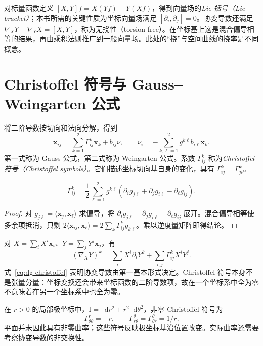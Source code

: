 \documentclass[UTF8,12pt,a4paper,fontset=fandol]{ctexbook}
\newcommand{\dd}{\mathop{}\!\mathrm d}
\newcommand{\ip}[2]{\langle #1,#2\rangle}
\begin{document}
对标量函数定义 $[X,Y]f=X(Yf)-Y(Xf)$，得到向量场的\emph{Lie 括号（Lie bracket）}；本书所需的关键性质为坐标向量场满足 $[\partial_i,\partial_j]=0$。协变导数还满足 $\nabla_XY-\nabla_YX=[X,Y]$，称为无挠性（torsion-free）。在坐标基上这是混合偏导相等的结果，再由乘积法则推广到一般向量场。此处的“挠”与空间曲线的挠率是不同概念。

\section{Christoffel 符号与 Gauss--Weingarten 公式}
将二阶导数按切向和法向分解，得到
\begin{equation}
 \mathbf x_{ij}=\sum_{k=1}^2\Gamma^k_{ij}\mathbf x_k+b_{ij}\nu,
 \qquad
 \nu_i=-\sum_{k,\ell=1}^2g^{k\ell}b_{i\ell}\mathbf x_k.
 \label{eq:dg-gauss-weingarten}
\end{equation}
第一式称为 Gauss 公式，第二式称为 Weingarten 公式。系数 $\Gamma^k_{ij}$ 称为\emph{Christoffel 符号（Christoffel symbols）}。它们描述坐标切向基自身的变化，具有 $\Gamma^k_{ij}=\Gamma^k_{ji}$。

\begin{proposition}
\begin{equation}
 \Gamma^k_{ij}=\frac12\sum_{\ell=1}^2g^{k\ell}
 (\partial_i g_{j\ell}+\partial_jg_{i\ell}-\partial_\ell g_{ij}).
 \label{eq:dg-christoffel}
\end{equation}
\end{proposition}
\begin{proof}
对 $g_{j\ell}=\ip{\mathbf x_j}{\mathbf x_\ell}$ 求偏导，将 $\partial_i g_{j\ell}+\partial_jg_{i\ell}-\partial_\ell g_{ij}$ 展开。混合偏导相等使多余项抵消，只剩 $2\ip{\mathbf x_{ij}}{\mathbf x_\ell}=2\sum_k\Gamma^k_{ij}g_{k\ell}$。乘以逆度量矩阵即得结论。
\end{proof}
对 $X=\sum_iX^i\mathbf x_i$、$Y=\sum_jY^j\mathbf x_j$，有
\begin{equation}
 (\nabla_XY)^k=\sum_iX^i\partial_iY^k+
 \sum_{i,j}\Gamma^k_{ij}X^iY^j.
 \label{eq:dg-covariant-coordinates}
\end{equation}
式~\eqref{eq:dg-christoffel} 表明协变导数由第一基本形式决定。Christoffel 符号本身不是张量分量：坐标变换还会带来坐标函数的二阶导数项，故在一个坐标系中全为零不意味着在另一个坐标系中也全为零。

\begin{example}[平面的极坐标]
在 $r>0$ 的局部极坐标中，$\mathrm I=\dd r^2+r^2\dd\theta^2$，非零 Christoffel 符号为
\[
 \Gamma^r_{\theta\theta}=-r,\qquad
 \Gamma^\theta_{r\theta}=\Gamma^\theta_{\theta r}=1/r.
\]
平面并未因此具有非零曲率；这些符号反映极坐标基沿位置改变。实际曲率还需要考察协变导数的非交换性。
\end{example}
\end{document}

